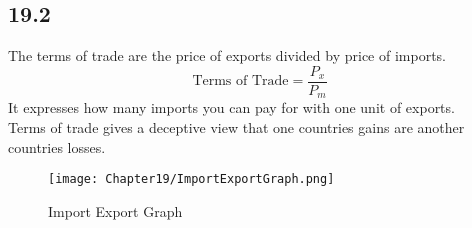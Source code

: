 \subsection*{19.2}
The terms of trade are the price of exports divided by price of imports.
\begin{equation}
    \text{Terms of Trade} = \frac{P_{x}}{P_{m}}
\end{equation}
It expresses how many imports you can pay for with one unit of exports.\\
Terms of trade gives a deceptive view that one countries gains are another countries losses.
\begin{figure}[H]
    \centering
    \texttt{[image: Chapter19/ImportExportGraph.png]}
    \caption{Import Export Graph}
    \label{fig:importexportgraph}
\end{figure}